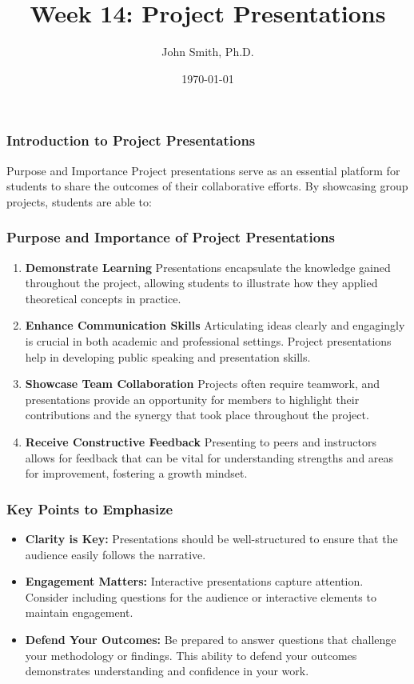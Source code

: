 \documentclass[aspectratio=169]{beamer}
\title[Academic Template]{Week 14: Project Presentations}
\author[J. Smith]{John Smith, Ph.D.}
\institute[University Name]{
  Department of Computer Science\\
  University Name\\
  \vspace{0.3cm}
  Email: email@university.edu\\
  Website: www.university.edu
}
\date{\today}
\begin{document}
\frame{\titlepage}

\begin{frame}[fragile]
    \frametitle{Introduction to Project Presentations}
    \begin{block}{Purpose and Importance}
        Project presentations serve as an essential platform for students to share the outcomes of their collaborative efforts. By showcasing group projects, students are able to:
    \end{block}
\end{frame}

\begin{frame}[fragile]
    \frametitle{Purpose and Importance of Project Presentations}
    \begin{enumerate}
        \item \textbf{Demonstrate Learning}  
            Presentations encapsulate the knowledge gained throughout the project, allowing students to illustrate how they applied theoretical concepts in practice.
        \item \textbf{Enhance Communication Skills}  
            Articulating ideas clearly and engagingly is crucial in both academic and professional settings. Project presentations help in developing public speaking and presentation skills.
        \item \textbf{Showcase Team Collaboration}  
            Projects often require teamwork, and presentations provide an opportunity for members to highlight their contributions and the synergy that took place throughout the project.
        \item \textbf{Receive Constructive Feedback}  
            Presenting to peers and instructors allows for feedback that can be vital for understanding strengths and areas for improvement, fostering a growth mindset.
    \end{enumerate}
\end{frame}

\begin{frame}[fragile]
    \frametitle{Key Points to Emphasize}
    \begin{itemize}
        \item \textbf{Clarity is Key:} Presentations should be well-structured to ensure that the audience easily follows the narrative.
        \item \textbf{Engagement Matters:} Interactive presentations capture attention. Consider including questions for the audience or interactive elements to maintain engagement.
        \item \textbf{Defend Your Outcomes:} Be prepared to answer questions that challenge your methodology or findings. This ability to defend your outcomes demonstrates understanding and confidence in your work.
    \end{itemize}
\end{frame}
\end{document}
